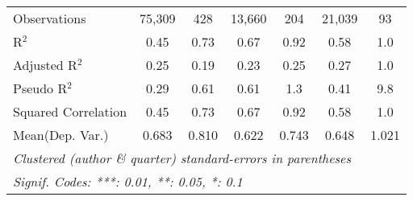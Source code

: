 \begin{tabular}{lcccccc}
   Observations                                               & 75,309      & 428        & 13,660  & 204          & 21,039  & 93\\  
   R$^2$                                                      & 0.45        & 0.73       & 0.67    & 0.92         & 0.58    & 1.0\\  
   Adjusted R$^2$                                             & 0.25        & 0.19       & 0.23    & 0.25         & 0.27    & 1.0\\  
   Pseudo R$^2$                                               & 0.29        & 0.61       & 0.61    & 1.3          & 0.41    & 9.8\\  
   Squared Correlation                                        & 0.45        & 0.73       & 0.67    & 0.92         & 0.58    & 1.0\\  
Mean(Dep. Var.) & 0.683 & 0.810 & 0.622 & 0.743 & 0.648 & 1.021 \\
   \midrule \midrule
   \multicolumn{7}{l}{\emph{Clustered (author \& quarter) standard-errors in parentheses}}\\
   \multicolumn{7}{l}{\emph{Signif. Codes: ***: 0.01, **: 0.05, *: 0.1}}\\
\end{tabular}
\par\endgroup
